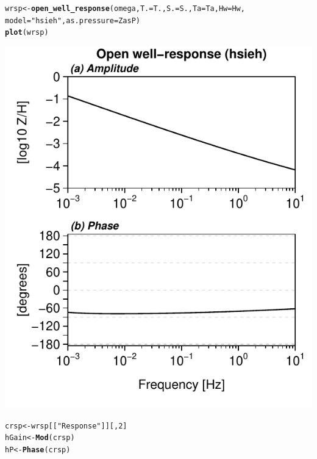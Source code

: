 \documentclass[12pt]{article}\usepackage[]{graphicx}\usepackage[]{color}
\makeatletter
\def\maxwidth{ %
  \ifdim\Gin@nat@width>\linewidth
    \linewidth
  \else
    \Gin@nat@width
  \fi
}
\newcommand{\hlnum}[1]{\textcolor[rgb]{0.686,0.059,0.569}{#1}}%
\newcommand{\hlstr}[1]{\textcolor[rgb]{0.192,0.494,0.8}{#1}}%
\newcommand{\hlstd}[1]{\textcolor[rgb]{0.345,0.345,0.345}{#1}}%
\newcommand{\hlkwb}[1]{\textcolor[rgb]{0.69,0.353,0.396}{#1}}%
\newcommand{\hlkwc}[1]{\textcolor[rgb]{0.333,0.667,0.333}{#1}}%
\newcommand{\hlkwd}[1]{\textcolor[rgb]{0.737,0.353,0.396}{\textbf{#1}}}%
\newenvironment{kframe}{%
 \def\at@end@of@kframe{}%
 \ifinner\ifhmode%
  \def\at@end@of@kframe{\end{minipage}}%
  \begin{minipage}{\columnwidth}%
 \fi\fi%
 \def\FrameCommand##1{\hskip\@totalleftmargin \hskip-\fboxsep
 \colorbox{shadecolor}{##1}\hskip-\fboxsep
     \hskip-\linewidth \hskip-\@totalleftmargin \hskip\columnwidth}%
 \MakeFramed {\advance\hsize-\width
   \@totalleftmargin\z@ \linewidth\hsize
   \@setminipage}}%
 {\par\unskip\endMakeFramed%
 \at@end@of@kframe}
\newenvironment{knitrout}{}{} %
\makeatother
\begin{document}
\begin{knitrout}\small
{}\color{fgcolor}\begin{kframe}
\begin{alltt}
\hlstd{wrsp} \hlkwb{<-} \hlkwd{open_well_response}\hlstd{(omega,} \hlkwc{T.} \hlstd{= T.,} \hlkwc{S.} \hlstd{= S.,} \hlkwc{Ta} \hlstd{= Ta,} \hlkwc{Hw} \hlstd{= Hw,}
    \hlkwc{model} \hlstd{=} \hlstr{"hsieh"}\hlstd{,} \hlkwc{as.pressure} \hlstd{= ZasP)}
\hlkwd{plot}\hlstd{(wrsp)}
\end{alltt}
\end{kframe}
\includegraphics[width=\maxwidth]{figure/HSIEHRESP-1} 
\begin{kframe}\begin{alltt}
\hlstd{crsp} \hlkwb{<-} \hlstd{wrsp[[}\hlstr{"Response"}\hlstd{]][,} \hlnum{2}\hlstd{]}
\hlstd{hGain} \hlkwb{<-} \hlkwd{Mod}\hlstd{(crsp)}
\hlstd{hP} \hlkwb{<-} \hlkwd{Phase}\hlstd{(crsp)}
\end{alltt}
\end{kframe}
\end{knitrout}
\end{document}
